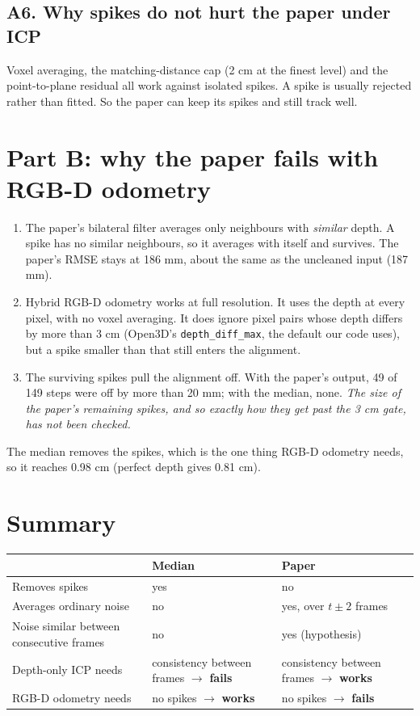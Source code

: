 \documentclass[11pt,a4paper]{article}
\begin{document}
\subsection*{A6. Why spikes do not hurt the paper under ICP}
Voxel averaging, the matching-distance cap (2 cm at the finest level) and the point-to-plane residual all work against isolated spikes. A spike is usually rejected rather than fitted. So the paper can keep its spikes and still track well.

\section*{Part B: why the paper fails with RGB-D odometry}
\begin{enumerate}[nosep]
\item The paper's bilateral filter averages only neighbours with \emph{similar} depth. A spike has no similar neighbours, so it averages with itself and survives. The paper's RMSE stays at 186 mm, about the same as the uncleaned input (187 mm).
\item Hybrid RGB-D odometry works at full resolution. It uses the depth at every pixel, with no voxel averaging. It does ignore pixel pairs whose depth differs by more than 3 cm (Open3D's \texttt{depth\_diff\_max}, the default our code uses), but a spike smaller than that still enters the alignment.
\item The surviving spikes pull the alignment off. With the paper's output, 49 of 149 steps were off by more than 20 mm; with the median, none. \emph{The size of the paper's remaining spikes, and so exactly how they get past the 3 cm gate, has not been checked.}
\end{enumerate}
The median removes the spikes, which is the one thing RGB-D odometry needs, so it reaches 0.98 cm (perfect depth gives 0.81 cm).

\section*{Summary}
\begin{center}
\begin{tabular}{p{3.2cm}p{5.6cm}p{5.6cm}}\toprule
 & Median & Paper\\\midrule
Removes spikes & yes & no\\
Averages ordinary noise & no & yes, over $t\pm2$ frames\\
Noise similar between consecutive frames & no & yes (hypothesis)\\
Depth-only ICP needs & consistency between frames $\to$ \textbf{fails} & consistency between frames $\to$ \textbf{works}\\
RGB-D odometry needs & no spikes $\to$ \textbf{works} & no spikes $\to$ \textbf{fails}\\\bottomrule
\end{tabular}
\end{center}
\end{document}
